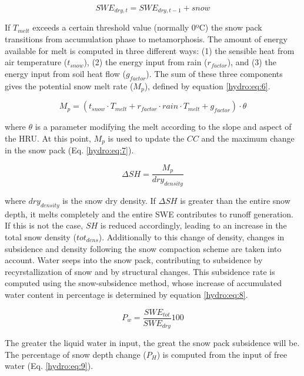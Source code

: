 \begin{equation} \label{hydro:eq:5}
 SWE_{dry,t} = SWE_{dry,t-1} + snow
\end{equation} 

If $T_{melt}$ exceeds a certain threshold value (normally 0ºC) the snow pack transitions from accumulation phase to metamorphosis. The amount of energy available for melt is computed in three different ways: (1) the sensible heat from air temperature ($t_{snow}$), (2) the energy input from rain ($r_{factor}$), and (3) the energy input from soil heat flow ($g_{factor}$). The sum of these three components gives the potential snow melt rate ($M_{p}$), defined by equation \ref{hydro:eq:6}.

\begin{equation} \label{hydro:eq:6}
 M_{p} = (t_{snow} \cdot T_{melt} + r_{factor} \cdot rain \cdot T_{melt} + g_{factor}) \cdot \theta
\end{equation} 

where $\theta$ is a parameter modifying the melt according to the slope and aspect of the HRU. At this point, $M_{p}$ is used to update the $CC$ and the maximum change in the snow pack (Eq. \ref{hydro:eq:7}).

\begin{equation} \label{hydro:eq:7}
 \Delta SH = \frac{M_{p}}{dry_{density}}
\end{equation} 

where $dry_{density}$ is the snow dry density. If $\Delta SH$ is greater than the entire snow depth, it melts completely and the entire SWE contributes to runoff generation. If this is not the case, $SH$ is reduced accordingly, leading to an increase in the total snow density ($tot_{dens}$). Additionally to this change of density, changes in subsidence and density following the snow compaction scheme \citep{bertle_effect_1966} are taken into account. Water seeps into the snow pack, contributing to subsidence by recyrstallization of snow and by structural changes. This subsidence rate is computed using the snow-subsidence method, whose increase of accumulated water content in percentage is determined by equation \ref{hydro:eq:8}.

\begin{equation} \label{hydro:eq:8}
 P_{w} = \frac{SWE_{tot}}{SWE_{dry}}100
\end{equation} 

The greater the liquid water in input, the great the snow pack subsidence will be. The percentage of snow depth change ($P_{H}$) is computed from the input of free water (Eq. \ref{hydro:eq:9}).

